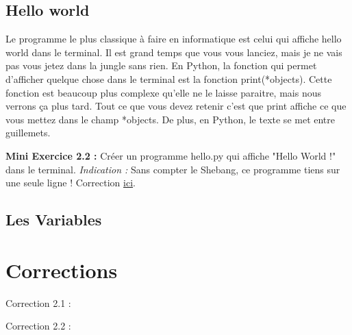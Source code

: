 \documentclass[a4paper,12pt]{article}
\begin{document}
\subsection{Hello world}

Le programme le plus classique à faire en informatique est celui qui affiche hello world dans le terminal. Il est grand temps que vous vous lanciez, mais je ne vais pas vous jetez dans la jungle sans rien.
En Python, la fonction qui permet d'afficher quelque chose dans le terminal est la fonction {\color{blue} print(*objects)}. 
Cette fonction est beaucoup plus complexe qu'elle ne le laisse paraitre, mais nous verrons ça plus tard. Tout ce que vous devez retenir c'est que print affiche ce que vous mettez dans le champ *objects.
De plus, en Python, le texte se met entre guillemets.

{\color{darkgreen}
\noindent\textbf{Mini Exercice 2.2 : } Créer un programme hello.py qui affiche "Hello World !" dans le terminal. \newline
\textit{Indication : } Sans compter le Shebang, ce programme tiens sur une seule ligne ! \newline
Correction \hyperlink{AncreExo2.2}{ici}.
}

\subsection{Les Variables}

\newpage

\section{Corrections}

\hypertarget{AncreExo2.1}{Correction 2.1 : }
\hypertarget{AncreExo2.2}{Correction 2.2 : }
\end{document}
